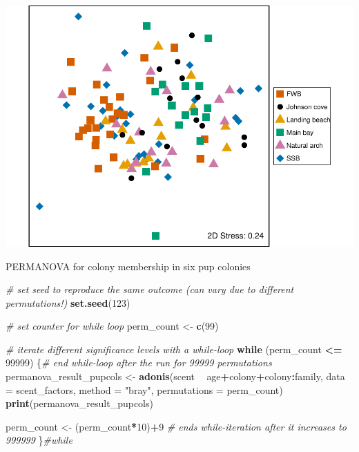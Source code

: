 \documentclass[]{article}
\newenvironment{Shaded}{\begin{snugshade}}{\end{snugshade}}
\newcommand{\KeywordTok}[1]{\textcolor[rgb]{0.13,0.29,0.53}{\textbf{#1}}}
\newcommand{\DataTypeTok}[1]{\textcolor[rgb]{0.13,0.29,0.53}{#1}}
\newcommand{\DecValTok}[1]{\textcolor[rgb]{0.00,0.00,0.81}{#1}}
\newcommand{\StringTok}[1]{\textcolor[rgb]{0.31,0.60,0.02}{#1}}
\newcommand{\CommentTok}[1]{\textcolor[rgb]{0.56,0.35,0.01}{\textit{#1}}}
\newcommand{\ControlFlowTok}[1]{\textcolor[rgb]{0.13,0.29,0.53}{\textbf{#1}}}
\newcommand{\OperatorTok}[1]{\textcolor[rgb]{0.81,0.36,0.00}{\textbf{#1}}}
\newcommand{\NormalTok}[1]{#1}
\begin{document}
\includegraphics{SealScent_SI_Markdown_2020_1_files/figure-latex/unnamed-chunk-5-1.pdf}

PERMANOVA for colony membership in six pup colonies

\begin{Shaded}
\begin{Highlighting}[]
\CommentTok{# set seed to reproduce the same outcome (can vary due to different permutations!)}
\KeywordTok{set.seed}\NormalTok{(}\DecValTok{123}\NormalTok{)}

\CommentTok{# set counter for while loop}
\NormalTok{perm_count <-}\StringTok{ }\KeywordTok{c}\NormalTok{(}\DecValTok{99}\NormalTok{)}

\CommentTok{# iterate different significance levels with a while-loop}
\ControlFlowTok{while}\NormalTok{ (perm_count }\OperatorTok{<=}\StringTok{ }\DecValTok{99999}\NormalTok{) \{}\CommentTok{# end while-loop after the run for 99999 permutations}
\NormalTok{  permanova_result_pupcols <-}\StringTok{ }\KeywordTok{adonis}\NormalTok{(scent }\OperatorTok{~}\StringTok{ }\NormalTok{age}\OperatorTok{+}\NormalTok{colony}\OperatorTok{+}\NormalTok{colony}\OperatorTok{:}\NormalTok{family, }
         \DataTypeTok{data =}\NormalTok{ scent_factors,}
         \DataTypeTok{method =} \StringTok{"bray"}\NormalTok{,}
         \DataTypeTok{permutations =}\NormalTok{ perm_count)}
  \KeywordTok{print}\NormalTok{(permanova_result_pupcols)}
  
\NormalTok{  perm_count <-}\StringTok{ }\NormalTok{(perm_count}\OperatorTok{*}\DecValTok{10}\NormalTok{)}\OperatorTok{+}\DecValTok{9} \CommentTok{# ends while-iteration after it increases to 999999}
\NormalTok{\}}\CommentTok{#while }
\end{Highlighting}
\end{Shaded}
\end{document}
